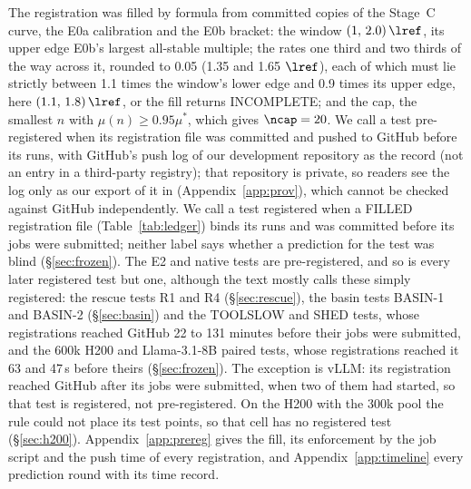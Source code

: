 The registration was filled by formula from committed copies of the Stage~C curve, the E0a calibration and the E0b bracket: the window $(1,\,2.0)\,\lref$, its upper edge E0b's largest all-stable multiple; the rates one third and two thirds of the way across it, rounded to 0.05 (1.35 and 1.65 $\lref$), each of which must lie strictly between 1.1 times the window's lower edge and 0.9 times its upper edge, here $(1.1,\,1.8)\,\lref$, or the fill returns INCOMPLETE; and the cap, the smallest $n$ with $\mu(n)\ge0.95\mu^*$, which gives $\ncap=20$. We call a test pre-registered when its registration file was committed and pushed to GitHub before its runs, with GitHub's push log of our development repository as the record (not an entry in a third-party registry); that repository is private, so readers see the log only as our export of it in  (Appendix~\ref{app:prov}), which cannot be checked against GitHub independently. We call a test registered when a FILLED registration file (Table~\ref{tab:ledger}) binds its runs and was committed before its jobs were submitted; neither label says whether a prediction for the test was blind (\S\ref{sec:frozen}). The E2 and native tests are pre-registered, and so is every later registered test but one, although the text mostly calls these simply registered: the rescue tests R1 and R4 (\S\ref{sec:rescue}), the basin tests BASIN-1 and BASIN-2 (\S\ref{sec:basin}) and the TOOLSLOW and SHED tests, whose registrations reached GitHub 22 to 131 minutes before their jobs were submitted, and the 600k H200 and Llama-3.1-8B paired tests, whose registrations reached it 63 and 47\,s before theirs (\S\ref{sec:frozen}). The exception is vLLM: its registration reached GitHub after its jobs were submitted, when two of them had started, so that test is registered, not pre-registered. On the H200 with the 300k pool the rule could not place its test points, so that cell has no registered test (\S\ref{sec:h200}). Appendix~\ref{app:prereg} gives the fill, its enforcement by the job script and the push time of every registration, and Appendix~\ref{app:timeline} every prediction round with its time record.

